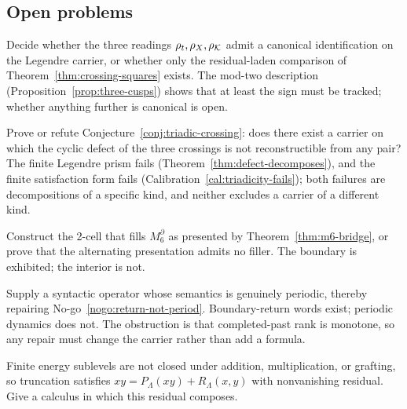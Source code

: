 \subsection{Open problems}

\begin{problem}\label{prob:canonical-readings}
Decide whether the three readings $\rho_t,\rho_X,\rho_\mathcal K$ admit a canonical
identification on the Legendre carrier, or whether only the residual-laden comparison of
Theorem~\ref{thm:crossing-squares} exists.  The mod-two description
(Proposition~\ref{prop:three-cusps}) shows that at least the sign must be tracked; whether
anything further is canonical is open.
\end{problem}

\begin{problem}\label{prob:non-decomposable}
Prove or refute Conjecture~\ref{conj:triadic-crossing}: does there exist a carrier on which
the cyclic defect of the three crossings is not reconstructible from any pair?  The finite
Legendre prism fails (Theorem~\ref{thm:defect-decomposes}), and the finite satisfaction form
fails (Calibration~\ref{cal:triadicity-fails}); both failures are decompositions of a
specific kind, and neither excludes a carrier of a different kind.
\end{problem}

\begin{problem}\label{prob:m6-filler}
Construct the 2-cell that fills $M_6^{\partial}$ as presented by
Theorem~\ref{thm:m6-bridge}, or prove that the alternating presentation admits no filler.
The boundary is exhibited; the interior is not.
\end{problem}

\begin{problem}\label{prob:feedback}
Supply a syntactic operator whose semantics is genuinely periodic, thereby repairing
No-go~\ref{nogo:return-not-period}.  Boundary-return words exist; periodic dynamics does
not.  The obstruction is that completed-past rank is monotone, so any repair must change the
carrier rather than add a formula.
\end{problem}

\begin{problem}\label{prob:truncation}
Finite energy sublevels are not closed under addition, multiplication, or grafting, so
truncation satisfies $xy=P_\Lambda(xy)+R_\Lambda(x,y)$ with nonvanishing residual.  Give a
calculus in which this residual composes.
\end{problem}

